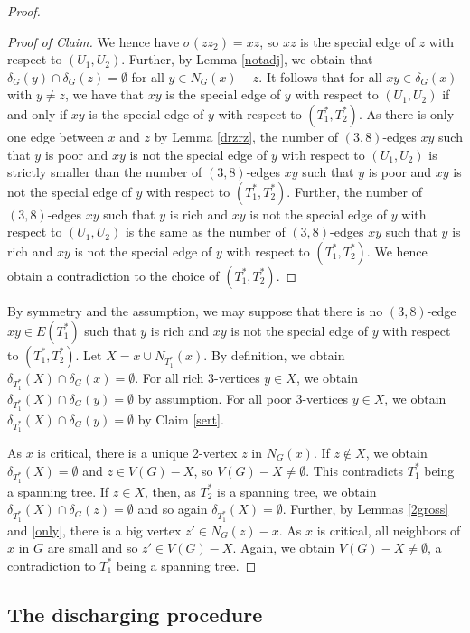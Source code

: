 \documentclass{article}
\theoremstyle{plain}
\theoremstyle{nonumberplain}
\theoremstyle{nonumberplain}
\begin{document}
\begin{proof}
\begin{proof}[Proof of Claim]
We hence have $\sigma(zz_2)=xz$, so $xz$ is the special edge of $z$ with respect to $(U_1,U_2)$. Further, by Lemma \ref{notadj}, we obtain that $\delta_G(y)\cap\delta_G(z)= \emptyset$ for all $y \in N_G(x)-z$. It follows that for all $xy\in \delta_G(x)$ with $y \neq z$, we have that $xy$ is the special edge of $y$ with respect to $(U_1,U_2)$ if and only if  $xy$ is the special edge of $y$ with respect to $(T^*_1,T^*_2)$. As there is only one edge between $x$ and $z$ by Lemma \ref{drzrz}, the number of $(3,8)$-edges $xy$ such that $y$ is poor and $xy$ is not the special edge of $y$ with respect to $(U_1,U_2)$ is strictly smaller than the number of $(3,8)$-edges $xy$ such that $y$ is poor and $xy$ is not the special edge of $y$ with respect to $(T^*_1,T^*_2)$. Further, the number of $(3,8)$-edges $xy$ such that $y$ is rich and $xy$ is not the special edge of $y$ with respect to $(U_1,U_2)$ is the same as the number of $(3,8)$-edges $xy$ such that $y$ is rich and $xy$ is not the special edge of $y$ with respect to $(T^*_1,T^*_2)$. We hence obtain a contradiction to the choice of $(T_1^*,T_2^*)$.
\renewcommand{\qedsymbol}{$\blacksquare$}
\end{proof}
By symmetry and the assumption, we may suppose that there is no $(3,8)$-edge $xy\in E(T_1^*)$ such that $y$ is rich and $xy$ is not the special edge of $y$ with respect to $(T_1^*,T_2^*)$. Let $X=x \cup N_{T_1^*}(x)$. By definition, we obtain $\delta_{T_1^*}(X)\cap \delta_G(x)=\emptyset$. For all rich 3-vertices $y \in X$, we obtain $\delta_{T_1^*}(X)\cap \delta_G(y)=\emptyset$ by assumption. For all poor 3-vertices $y \in X$, we obtain $\delta_{T_1^*}(X)\cap \delta_G(y)=\emptyset$ by Claim \ref{sert}.

 As $x$ is critical, there is a unique 2-vertex $z$ in $N_G(x)$. If $z \notin X$, we obtain $\delta_{T_1^*}(X)=\emptyset$ and $z \in V(G)-X$, so $V(G)-X \neq \emptyset$. This contradicts $T_1^*$ being a spanning tree. If $z \in X$, then, as $T_2^*$ is a spanning tree, we obtain $\delta_{T_1^*}(X)\cap \delta_G(z)=\emptyset$ and so again $\delta_{T_1^*}(X)=\emptyset$. Further, by Lemmas \ref{2gross} and \ref{only}, there is a big vertex $z'\in N_G(z)-x$. As $x$ is critical, all neighbors of $x$ in $G$ are small and so $z' \in V(G)-X$. Again, we obtain $V(G)-X \neq \emptyset$, a contradiction to $T_1^*$ being a spanning tree.
\end{proof}
\subsection{The discharging procedure}\label{charge}
\end{document}
